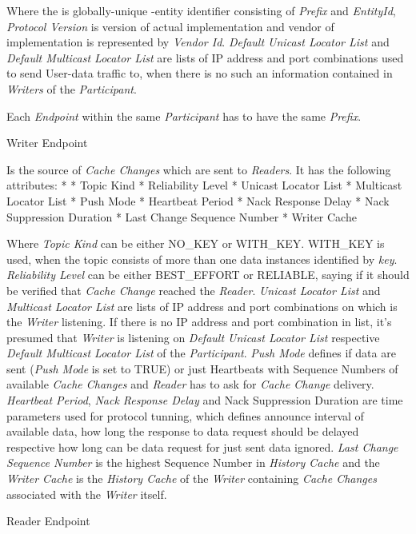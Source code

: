 Where the {\em {}} is globally-unique -entity identifier consisting of {\em {} Prefix} and {\em EntityId}, {\em Protocol Version} is version of actual implementation and vendor of implementation is represented by {\em Vendor Id}. {\em Default Unicast Locator List} and {\em Default Multicast Locator List} are lists of IP address and port combinations used to send User-data traffic to, when there is no such an information contained in {\em Writers} of the {\em Participant}.

Each {\em Endpoint} within the same {\em Participant} has to have the same {\em {} Prefix}.

\secc Writer Endpoint

Is the source of {\em Cache Changes} which are sent to {\em Readers}. It has the following attributes:
\begitems
* 
* Topic Kind
* Reliability Level
* Unicast Locator List
* Multicast Locator List
* Push Mode
* Heartbeat Period
* Nack Response Delay
* Nack Suppression Duration
* Last Change Sequence Number
* Writer Cache
\enditems

Where {\em Topic Kind} can be either NO\_KEY or WITH\_KEY. WITH\_KEY is used, when the topic consists of more than one data instances identified by {\em key}. {\em Reliability Level} can be either BEST\_EFFORT or RELIABLE, saying if it should be verified that {\em Cache Change} reached the {\em Reader}. {\em Unicast Locator List} and {\em Multicast Locator List} are lists of IP address and port combinations on which is the {\em Writer} listening. If there is no IP address and port combination in list, it's presumed that {\em Writer} is listening on {\em Default Unicast Locator List} respective {\em Default Multicast Locator List} of the {\em Participant}. {\em Push Mode} defines if data are sent ({\em Push Mode} is set to TRUE) or just Heartbeats with Sequence Numbers of available {\em Cache Changes} and {\em Reader} has to ask for {\em Cache Change} delivery. {\em Heartbeat Period}, {\em Nack Response Delay} and {Nack Suppression Duration} are time parameters used for protocol tunning, which defines announce interval of available data, how long the response to data request should be delayed respective how long can be data request for just sent data ignored. {\em Last Change Sequence Number} is the highest Sequence Number in {\em History Cache} and the {\em Writer Cache} is the {\em History Cache} of the {\em Writer} containing {\em Cache Changes} associated with the {\em Writer} itself.

\secc Reader Endpoint

